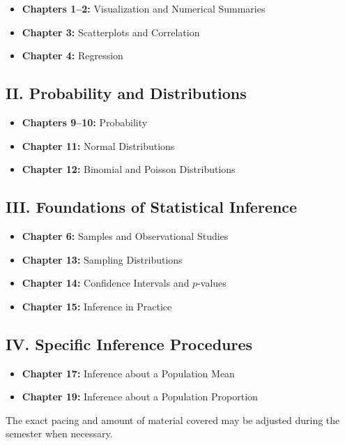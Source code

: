\documentclass[10pt]{article}
\begin{document}
\begin{itemize}
    \item \textbf{Chapters 1--2:} Visualization and Numerical Summaries
    \item \textbf{Chapter 3:} Scatterplots and Correlation
    \item \textbf{Chapter 4:} Regression
\end{itemize}

\subsection{II. Probability and Distributions}

\begin{itemize}
    \item \textbf{Chapters 9--10:} Probability
    \item \textbf{Chapter 11:} Normal Distributions
    \item \textbf{Chapter 12:} Binomial and Poisson Distributions
\end{itemize}

\subsection{III. Foundations of Statistical Inference}

\begin{itemize}
    \item \textbf{Chapter 6:} Samples and Observational Studies
    \item \textbf{Chapter 13:} Sampling Distributions
    \item \textbf{Chapter 14:} Confidence Intervals and \(p\)-values
    \item \textbf{Chapter 15:} Inference in Practice
\end{itemize}

\subsection{IV. Specific Inference Procedures}

\begin{itemize}
    \item \textbf{Chapter 17:} Inference about a Population Mean
    \item \textbf{Chapter 19:} Inference about a Population Proportion
\end{itemize}

The exact pacing and amount of material covered may be adjusted during the semester when necessary.
\end{document}
